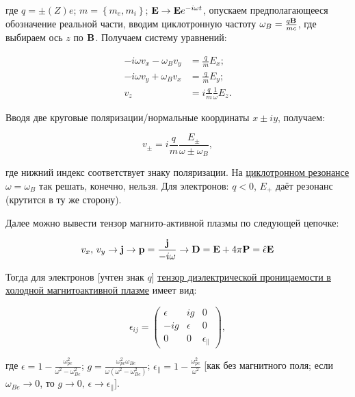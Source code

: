 \documentclass[10pt, a4paper]{article}
\begin{document}
где $q=\pm (Z)e$; $m=\left\lbrace m_e, m_i\right\rbrace$; $\vb{E}\rightarrow\vb{E}e^{-i\omega t}$, опускаем предполагающееся обозначение реальной части, вводим циклотронную частоту $\vb{\omega}_B = \frac{q\vb{B}}{mc}$, где выбираем ось $z$ по $\vb{B}$. Получаем систему уравнений:

\begin{align*}
	-i\omega v_x-\omega_B v_y &= \frac{q}{m}E_x;\\
	-i\omega v_y +\omega_B v_x &= \frac{q}{m}E_y;\\
	v_z &= i\frac{q}{m}\frac{1}{\omega}E_z. 
\end{align*}

Вводя две круговые поляризации/нормальные координаты $x\pm iy$, получаем:

\begin{equation*}
	v_\pm = i\frac{q}{m}\frac{E_\pm}{\omega\pm\omega_B},
\end{equation*}

где нижний индекс соответствует знаку поляризации. На \uline{циклотронном резонансе} $\omega=\omega_B$ так решать, конечно, нельзя. Для электронов: $q<0$, $E_{+}$ даёт резонанс (крутится в ту же сторону).

Далее можно вывести тензор магнито-активной плазмы по следующей цепочке:

\begin{equation*}
	v_x,\,v_y\rightarrow\vb{j}\rightarrow\vb{p}=\frac{\vb{j}}{-i\omega}\rightarrow\vb{D}=\vb{E}+4\pi\vb{P}=\hat{\epsilon}\vb{E}
\end{equation*}

Тогда для электронов [учтен знак $q$] \uline{тензор диэлектрической проницаемости в холодной \linebreak магнитоактивной плазме} имеет вид:

\begin{equation*}
	\epsilon_{ij} =
	\begin{pmatrix}
		\epsilon & ig & 0 \\
		-ig & \epsilon & 0 \\
		0 & 0 & \epsilon_\parallel
	\end{pmatrix},
\end{equation*}

где $\epsilon = 1-\frac{\omega_{pe}^2}{\omega^2-\omega_{Be}^2}$; $g = \frac{\omega_{pe}^2\omega_{Be}} {\omega\left(\omega^2-\omega_{Be}^2\right)}$; $\epsilon_\parallel = 1-\frac{\omega_{pe}^2}{\omega^2}$ [как без магнитного поля; если $\omega_{Be}\rightarrow 0$, то $g\rightarrow 0,\,\epsilon\rightarrow\epsilon_\parallel$].
\end{document}
